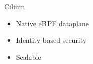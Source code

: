 \documentclass[black,white]{beamer}
\DeclareRobustCommand{\#}{\adjustbox{valign=B,totalheight=.57\baselineskip}{\oldhash}}%
\begin{document}
    \begin{frame}{Cilium}
        \begin{table}
            \begin{subtable}[l]{0.45\textwidth}
                \begin{itemize}
                    \item Native eBPF dataplane \medskip
                    \item Identity-based security \medskip
                    \item Scalable \medskip
                \end{itemize}
            \end{subtable}
            \begin{subtable}[r]{0.5\textwidth}
                \begin{figure}
                    
                \end{figure}
            \end{subtable}
        \end{table}
    \end{frame}
\end{document}
